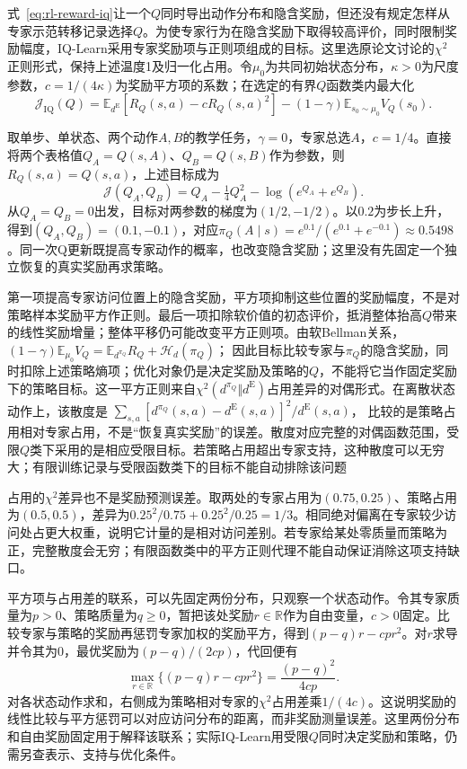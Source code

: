 式~\eqref{eq:rl-reward-iq}让一个$Q$同时导出动作分布和隐含奖励，但还没有规定怎样从专家示范转移记录选择$Q$。为使专家行为在隐含奖励下取得较高评价，同时限制奖励幅度，IQ-Learn采用专家奖励项与正则项组成的目标。这里选原论文讨论的$\chi^2$正则形式，保持上述温度1及归一化占用。令$\mu_0$为共同初始状态分布，$\kappa>0$为尺度参数，$c=1/(4\kappa)$为奖励平方项的系数；在选定的有界$Q$函数类内最大化
\[
  \mathcal J_{\mathrm{IQ}}(Q)
  =\mathbb E_{d^{\mathrm E}}
       \left[R_Q(s,a)-cR_Q(s,a)^2\right]
     -(1-\gamma)\mathbb E_{s_0\sim\mu_0}V_Q(s_0).
\]
\begin{example}[一个软Q同时改变奖励与动作概率]
  \label{ex:rl-reward-iq-step}
  取单步、单状态、两个动作$A,B$的教学任务，$\gamma=0$，专家总选$A$，$c=1/4$。直接将两个表格值$Q_A=Q(s,A)$、$Q_B=Q(s,B)$作为参数，则$R_Q(s,a)=Q(s,a)$，上述目标成为
  \[
    \mathcal J(Q_A,Q_B)
      =Q_A-\tfrac14Q_A^2-\log(e^{Q_A}+e^{Q_B}).
  \]
  从$Q_A=Q_B=0$出发，目标对两参数的梯度为$(1/2,-1/2)$。以$0.2$为步长上升，得到$(Q_A,Q_B)=(0.1,-0.1)$，对应$\pi_Q(A\mid s)=e^{0.1}/(e^{0.1}+e^{-0.1})\approx0.5498$。同一次Q更新既提高专家动作的概率，也改变隐含奖励；这里没有先固定一个独立恢复的真实奖励再求策略。
\end{example}

第一项提高专家访问位置上的隐含奖励，平方项抑制这些位置的奖励幅度，不是对策略样本奖励平方作正则。最后一项扣除软价值的初态评价，抵消整体抬高$Q$带来的线性奖励增量；整体平移仍可能改变平方正则项。由软Bellman关系，
$(1-\gamma)\mathbb E_{\mu_0}V_Q
=\mathbb E_{d^{\pi_Q}}R_Q+\mathcal H_d(\pi_Q)$；
因此目标比较专家与$\pi_Q$的隐含奖励，同时扣除上述策略熵项；优化对象仍是决定奖励及策略的$Q$，不能将它当作固定奖励下的策略目标。这一平方正则来自$\chi^2(d^{\pi_Q}\Vert d^{\mathrm E})$占用差异的对偶形式。在离散状态动作上，该散度是
$\sum_{s,a}[d^{\pi_Q}(s,a)-d^{\mathrm E}(s,a)]^2/d^{\mathrm E}(s,a)$，
比较的是策略占用相对专家占用，不是“恢复真实奖励”的误差。散度对应完整的对偶函数范围，受限$Q$类下采用的是相应受限目标。若策略占用超出专家支持，这种散度可以无穷大；有限训练记录与受限函数类下的目标不能自动排除该问题

占用的$\chi^2$差异也不是奖励预测误差。取两处的专家占用为$(0.75,0.25)$、策略占用为$(0.5,0.5)$，差异为$0.25^2/0.75+0.25^2/0.25=1/3$。相同绝对偏离在专家较少访问处占更大权重，说明它计量的是相对访问差别。若专家给某处零质量而策略为正，完整散度会无穷；有限函数类中的平方正则代理不能自动保证消除这项支持缺口。

平方项与占用差的联系，可以先固定两份分布，只观察一个状态动作。令其专家质量为$p>0$、策略质量为$q\geq0$，暂把该处奖励$r\in\mathbb R$作为自由变量，$c>0$固定。比较专家与策略的奖励再惩罚专家加权的奖励平方，得到$(p-q)r-cpr^2$。对$r$求导并令其为0，最优奖励为$(p-q)/(2cp)$，代回便有
\[
 \max_{r\in\mathbb R}\{(p-q)r-cpr^2\}
   =\frac{(p-q)^2}{4cp}.
\]
对各状态动作求和，右侧成为策略相对专家的$\chi^2$占用差乘$1/(4c)$。这说明奖励的线性比较与平方惩罚可以对应访问分布的距离，而非奖励测量误差。这里两份分布和自由奖励固定用于解释该联系；实际IQ-Learn用受限$Q$同时决定奖励和策略，仍需另查表示、支持与优化条件。

